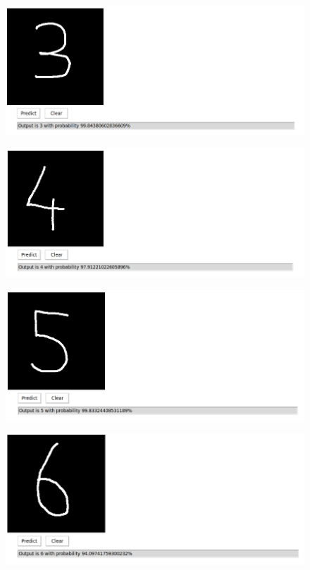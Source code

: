 \documentclass[letterpaper]{article}
\begin{document}
\begin{large}
    \begin{figure}[!ht]
        \centering
        \includegraphics[scale = 0.5]{../figs/3.png}
    \end{figure}

    \begin{figure}[!ht]
        \centering
        \includegraphics[scale = 0.5]{../figs/4.png}
    \end{figure}
    
    \begin{figure}[!ht]
        \centering
        \includegraphics[scale = 0.5]{../figs/5.png}
    \end{figure}

    \begin{figure}[!ht]
        \centering
        \includegraphics[scale = 0.5]{../figs/6.png}
    \end{figure}


\end{large}
\end{document}
